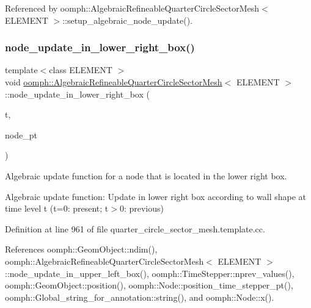 Referenced by oomph\+::\+Algebraic\+Refineable\+Quarter\+Circle\+Sector\+Mesh$<$ E\+L\+E\+M\+E\+N\+T $>$\+::setup\+\_\+algebraic\+\_\+node\+\_\+update().

\mbox{\label{classoomph_1_1AlgebraicRefineableQuarterCircleSectorMesh_a9a7d3e4a2126346cdae3bde51eff7b36}} 
\subsubsection{\texorpdfstring{node\+\_\+update\+\_\+in\+\_\+lower\+\_\+right\+\_\+box()}{node\_update\_in\_lower\_right\_box()}}
{\footnotesize\ttfamily template$<$class E\+L\+E\+M\+E\+NT $>$ \\
void \hyperlink{classoomph_1_1AlgebraicRefineableQuarterCircleSectorMesh}{oomph\+::\+Algebraic\+Refineable\+Quarter\+Circle\+Sector\+Mesh}$<$ E\+L\+E\+M\+E\+NT $>$\+::node\+\_\+update\+\_\+in\+\_\+lower\+\_\+right\+\_\+box (\begin{DoxyParamCaption}\item[{const unsigned \&}]{t,  }\item[{\hyperlink{classoomph_1_1AlgebraicNode}{Algebraic\+Node} $\ast$\&}]{node\+\_\+pt }\end{DoxyParamCaption})\hspace{0.3cm}{\ttfamily [private]}}



Algebraic update function for a node that is located in the lower right box. 

Algebraic update function\+: Update in lower right box according to wall shape at time level t (t=0\+: present; t$>$0\+: previous) 

Definition at line 961 of file quarter\+\_\+circle\+\_\+sector\+\_\+mesh.\+template.\+cc.



References oomph\+::\+Geom\+Object\+::ndim(), oomph\+::\+Algebraic\+Refineable\+Quarter\+Circle\+Sector\+Mesh$<$ E\+L\+E\+M\+E\+N\+T $>$\+::node\+\_\+update\+\_\+in\+\_\+upper\+\_\+left\+\_\+box(), oomph\+::\+Time\+Stepper\+::nprev\+\_\+values(), oomph\+::\+Geom\+Object\+::position(), oomph\+::\+Node\+::position\+\_\+time\+\_\+stepper\+\_\+pt(), oomph\+::\+Global\+\_\+string\+\_\+for\+\_\+annotation\+::string(), and oomph\+::\+Node\+::x().



